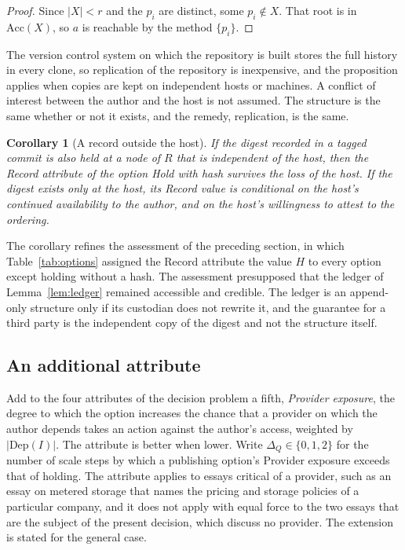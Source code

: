 \documentclass[11pt]{article}
\theoremstyle{plain}
\newtheorem{corollary}[theorem]{Corollary}
\theoremstyle{definition}
\theoremstyle{remark}
\begin{document}
\begin{proof}
Since $|X|<r$ and the $p_i$ are distinct, some $p_i\notin X$. That root is in $\mathrm{Acc}(X)$, so $a$ is reachable by the method $\{p_i\}$. \qedhere
\end{proof}

The version control system on which the repository is built stores the full history in every clone, so replication of the repository is inexpensive, and the proposition applies when copies are kept on independent hosts or machines. A conflict of interest between the author and the host is not assumed. The structure is the same whether or not it exists, and the remedy, replication, is the same.

\begin{corollary}[A record outside the host]\label{cor:record}
If the digest recorded in a tagged commit is also held at a node of $R$ that is independent of the host, then the \emph{Record} attribute of the option \emph{Hold with hash} survives the loss of the host. If the digest exists only at the host, its Record value is conditional on the host's continued availability to the author, and on the host's willingness to attest to the ordering.
\end{corollary}

The corollary refines the assessment of the preceding section, in which Table~\ref{tab:options} assigned the Record attribute the value $H$ to every option except holding without a hash. The assessment presupposed that the ledger of Lemma~\ref{lem:ledger} remained accessible and credible. The ledger is an append-only structure only if its custodian does not rewrite it, and the guarantee for a third party is the independent copy of the digest and not the structure itself.

\subsection{An additional attribute}

Add to the four attributes of the decision problem a fifth, \emph{Provider exposure}, the degree to which the option increases the chance that a provider on which the author depends takes an action against the author's access, weighted by $|\mathrm{Dep}(I)|$. The attribute is better when lower. Write $\Delta_Q\in\{0,1,2\}$ for the number of scale steps by which a publishing option's Provider exposure exceeds that of holding. The attribute applies to essays critical of a provider, such as an essay on metered storage that names the pricing and storage policies of a particular company, and it does not apply with equal force to the two essays that are the subject of the present decision, which discuss no provider. The extension is stated for the general case.
\end{document}
